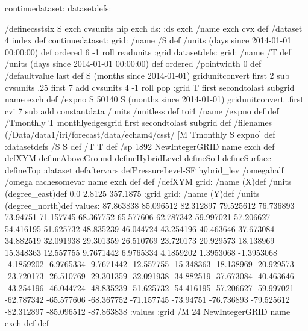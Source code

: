 \begin{ingrid}
continuedataset:
datasetdefs:
\end{ingrid}
\begin{ingrid}
/definecsstsix {
S exch cvsunits nip
exch
ds: :ds
exch /name exch cvx def
/dataset 4 index def
continuedataset:
grid: /name /S def /units (days since 2014-01-01 00:00:00) def ordered 
6 -1 roll 
readunits :grid
datasetdefs:
grid: /name /T def /units (days since 2014-01-01 00:00:00) def ordered
/pointwidth 0 def
/defaultvalue {last} def
S (months since 2014-01-01) gridunitconvert
first 2 sub cvsunits .25
first 7 add cvsunits
4 -1 roll pop
:grid
T first secondtolast subgrid name exch def
/expno 
S
50140 S (months since 2014-01-01) gridunitconvert .first cvi 7 sub add 
constantdata /units /unitless def toi4
/name /expno def
def
/Tmonthly T monthlyedgesgrid first secondtolast subgrid def
/filenames {
(/Data/data1/iri/forecast/data/echam4/csst/%
[M Tmonthly S expno]} def
:datasetdefs
/S S def
/T T def
/sp 1892 NewIntegerGRID name exch def
defXYM
defineAboveGround
defineHybridLevel
defineSoil
defineSurface
defineTop
:dataset
defaftervars
defPressureLevel-SF 
hybrid_lev /omegahalf /omega cachesomevar
name exch def
} def
/defXYM {
grid:
/name (X)def
/units (degree_east)def
 0.0 2.8125 357.1875
:grid
grid:
/name (Y)def
/units (degree_north)def
values: 87.863838 85.096512 82.312897 79.525612 76.736893 73.94751 71.157745 68.367752 65.577606 62.787342 59.997021 57.206627 54.416195 51.625732 48.835239 46.044724 43.254196 40.463646 37.673084 34.882519 32.091938 29.301359 26.510769 23.720173 20.929573 18.138969 15.348363 12.557755 9.7671442 6.9765334 4.1859202 1.3953068 -1.3953068 -4.1859202 -6.9765334 -9.7671442 -12.557755 -15.348363 -18.138969 -20.929573 -23.720173 -26.510769 -29.301359 -32.091938 -34.882519 -37.673084 -40.463646 -43.254196 -46.044724 -48.835239 -51.625732 -54.416195 -57.206627 -59.997021 -62.787342 -65.577606 -68.367752 -71.157745 -73.94751 -76.736893 -79.525612 -82.312897 -85.096512 -87.863838 :values
:grid
/M 24 NewIntegerGRID name exch def
} def
\end{ingrid}
